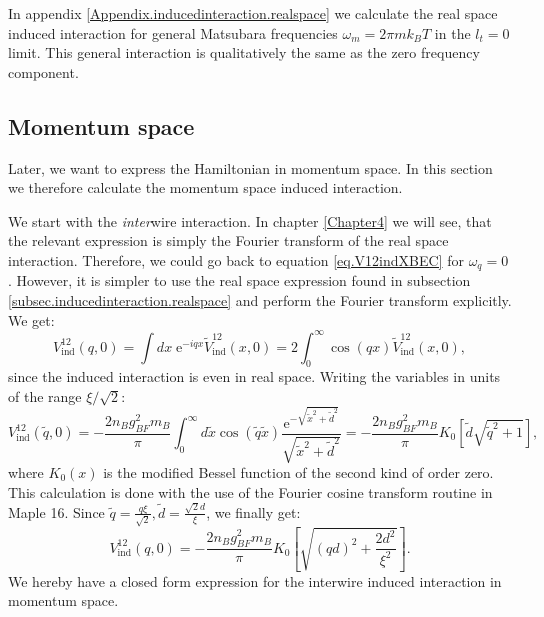 In appendix \ref{Appendix.inducedinteraction.realspace} we calculate the real space induced interaction for general Matsubara frequencies $\omega_m = 2\pi m k_BT$ in the $l_t = 0$ limit. This general interaction is qualitatively the same as the zero frequency component.  

\subsection{Momentum space}
\label{subsec.inducedinteraction.momentumspace}
Later, we want to express the Hamiltonian in momentum space. In this section we therefore calculate the momentum space induced interaction. 

We start with the \textit{inter}wire interaction. In chapter \ref{Chapter4} we will see, that the relevant expression is simply the Fourier transform of the real space interaction. Therefore, we could go back to equation \eqref{eq.V12indXBEC} for $\omega_q = 0$. However, it is simpler to use the real space expression found in subsection \ref{subsec.inducedinteraction.realspace} and perform the Fourier transform explicitly. We get:
\begin{equation}
V_{\text{ind}}^{12}(q,0) = \int dx \; \text{e}^{-iqx}\tilde{V}_{\text{ind}}^{12}(x,0) = 2\int_0^\infty \cos(qx)\tilde{V}_{\text{ind}}^{12}(x,0), \nonumber
\end{equation}
since the induced interaction is even in real space. Writing the variables in units of the range $\xi/\sqrt{2}$:
\begin{equation}
V_{\text{ind}}^{12}(\tilde{q},0) = -\frac{2n_Bg^2_{BF}m_B}{\pi}\int_0^\infty d\tilde{x} \cos(\tilde{q}\tilde{x})\frac{ \text{e}^{ -\sqrt{\tilde{x}^2+\tilde{d}^2} } }{\sqrt{\tilde{x}^2+\tilde{d}^2}} = -\frac{2n_Bg^2_{BF}m_B}{\pi}K_0\left[\tilde{d}\sqrt{\tilde{q}^2+1}\right], \nonumber
\end{equation}
where $K_0(x)$ is the modified Bessel function of the second kind of order zero. This calculation is done with the use of the Fourier cosine transform routine in Maple 16. Since $\tilde{q} = \frac{q\xi}{\sqrt{2}}, \tilde{d} = \frac{\sqrt{2}d}{\xi}$, we finally get:
 \begin{equation}
V_{\text{ind}}^{12}(q,0) = -\frac{2n_Bg^2_{BF}m_B}{\pi}K_0\left[\sqrt{(qd)^2+\frac{2d^2}{\xi^2}}\right]. 
\label{eq.V12indq.zerofrequency}
\end{equation}
We hereby have a closed form expression for the interwire induced interaction in momentum space. 

